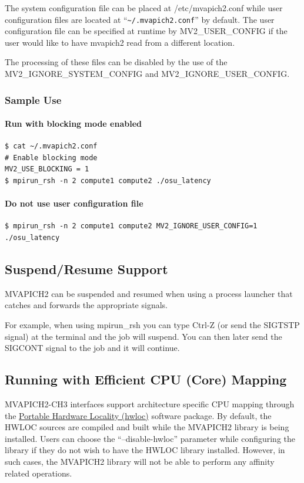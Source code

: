 The system configuration file can be placed at /etc/mvapich2.conf while user
configuration files are located at ``\verb|~/.mvapich2.conf|'' by default.  The
user configuration file can be specified at runtime by MV2\_USER\_CONFIG if the
user would like to have mvapich2 read from a different location.

The processing of these files can be disabled by the use of the
MV2\_IGNORE\_SYSTEM\_CONFIG and MV2\_IGNORE\_USER\_CONFIG.

\subsubsection{Sample Use}
\paragraph{Run with blocking mode enabled}
\begin{verbatim}
$ cat ~/.mvapich2.conf
# Enable blocking mode
MV2_USE_BLOCKING = 1
$ mpirun_rsh -n 2 compute1 compute2 ./osu_latency
\end{verbatim}

\paragraph{Do not use user configuration file}
\begin{verbatim}
$ mpirun_rsh -n 2 compute1 compute2 MV2_IGNORE_USER_CONFIG=1 ./osu_latency
\end{verbatim}

\subsection{Suspend/Resume Support}
\label{sec:usage:suspend-resume}
MVAPICH2 can be suspended and resumed when using a process launcher that
catches and forwards the appropriate signals.

For example, when using mpirun\_rsh you can type Ctrl-Z (or send the SIGTSTP
signal) at the terminal and the job will suspend.  You can then later send the
SIGCONT signal to the job and it will continue.

\subsection{Running with Efficient CPU (Core) Mapping}
\label{sec:usage:mv2-cpu-mapping}

MVAPICH2-CH3 interfaces support
architecture specific CPU mapping through the
\href{http://www.open-mpi.org/projects/hwloc}
{Portable
Hardware Locality (hwloc)} software package.
By default, the HWLOC sources are compiled and built while the
MVAPICH2 library is being installed. Users can choose the
``--disable-hwloc'' parameter while configuring the library if they
do not wish to have the HWLOC library installed. However, in
such cases, the MVAPICH2 library will not be able to perform
any affinity related operations.


